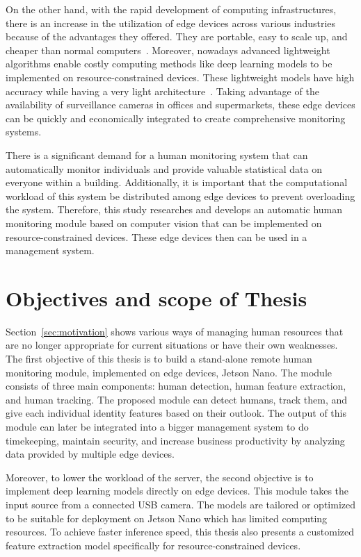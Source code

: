 \documentclass[../main.tex]{subfiles}
\begin{document}
On the other hand, with the rapid development of computing infrastructures, there is an increase in the utilization of edge devices across various industries because of the advantages they offered. They are portable, easy to scale up, and cheaper than normal computers~\cite{sarwar2019machine}. Moreover, nowadays advanced lightweight algorithms enable costly computing methods like deep learning models to be implemented on resource-constrained devices. These lightweight models have high accuracy while having a very light architecture~\cite{zhang2018shufflenet, sandler2018mobilenetv2}. Taking advantage of the availability of surveillance cameras in offices and supermarkets, these edge devices can be quickly and economically integrated to create comprehensive monitoring systems.

There is a significant demand for a human monitoring system that can automatically monitor individuals and provide valuable statistical data on everyone within a building. Additionally, it is important that the computational workload of this system be distributed among edge devices to prevent overloading the system. Therefore, this study researches and develops an automatic human monitoring module based on computer vision that can be implemented on resource-constrained devices. These edge devices then can be used in a management system.

\section{Objectives and scope of Thesis} 
\label{sec:objectives}
Section~\ref{sec:motivation} shows various ways of managing human resources that are no longer appropriate for current situations or have their own weaknesses. The first objective of this thesis is to build a stand-alone remote human monitoring module, implemented on edge devices, Jetson Nano. The module consists of three main components: human detection, human feature extraction, and human tracking. The proposed module can detect humans, track them, and give each individual identity features based on their outlook. The output of this module can later be integrated into a bigger management system to do timekeeping, maintain security, and increase business productivity by analyzing data provided by multiple edge devices.

Moreover, to lower the workload of the server, the second objective is to implement deep learning models directly on edge devices. This module takes the input source from a connected USB camera. The models are tailored or optimized to be suitable for deployment on Jetson Nano which has limited computing resources. To achieve faster inference speed, this thesis also presents a customized feature extraction model specifically for resource-constrained devices. %
\end{document}
